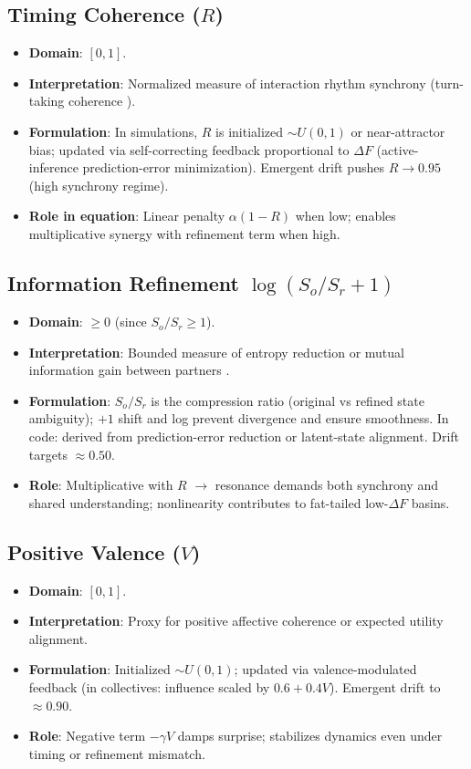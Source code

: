 \documentclass[11pt,a4paper]{article}
\begin{document}
	\subsection{\texorpdfstring {Timing Coherence ($R$)}{Timing Coherence (R)}}
	\begin{itemize}[leftmargin=*,labelsep=1em]
		\item \textbf{Domain}: $[0,1]$.
		\item \textbf{Interpretation}: Normalized measure of interaction rhythm synchrony (turn-taking coherence \citep{levinson2015timing}).
		\item \textbf{Formulation}: In simulations, $R$ is initialized $\sim U(0,1)$ or near-attractor bias; updated via self-correcting feedback proportional to $\Delta F$ (active-inference prediction-error minimization). Emergent drift pushes $R \to 0.95$ (high synchrony regime).
		\item \textbf{Role in equation}: Linear penalty $\alpha(1 - R)$ when low; enables multiplicative synergy with refinement term when high.
	\end{itemize}
	\subsection{\texorpdfstring {Information Refinement $\log(S_o/S_r + 1)$}{Information Refinement log(So/Sr + 1)}}
	\begin{itemize}[leftmargin=*,labelsep=1em]
		\item \textbf{Domain}: $\geq 0$ (since $S_o/S_r \geq 1$).
		\item \textbf{Interpretation}: Bounded measure of entropy reduction or mutual information gain between partners \citep{shannon1948}.
		\item \textbf{Formulation}: $S_o/S_r$ is the compression ratio (original vs refined state ambiguity); $+1$ shift and log prevent divergence and ensure smoothness. In code: derived from prediction-error reduction or latent-state alignment. Drift targets $\approx 0.50$.
		\item \textbf{Role}: Multiplicative with $R$ $\to$ resonance demands both synchrony and shared understanding; nonlinearity contributes to fat-tailed low-$\Delta F$ basins.
	\end{itemize}
	\subsection{\texorpdfstring {Positive Valence ($V$)}{Positive Valence (V)}}
	\begin{itemize}[leftmargin=*,labelsep=1em]
		\item \textbf{Domain}: $[0,1]$.
		\item \textbf{Interpretation}: Proxy for positive affective coherence or expected utility alignment.
		\item \textbf{Formulation}: Initialized $\sim U(0,1)$; updated via valence-modulated feedback (in collectives: influence scaled by $0.6 + 0.4V$). Emergent drift to $\approx 0.90$.
		\item \textbf{Role}: Negative term $-\gamma V$ damps surprise; stabilizes dynamics even under timing or refinement mismatch.
	\end{itemize}
\end{document}
